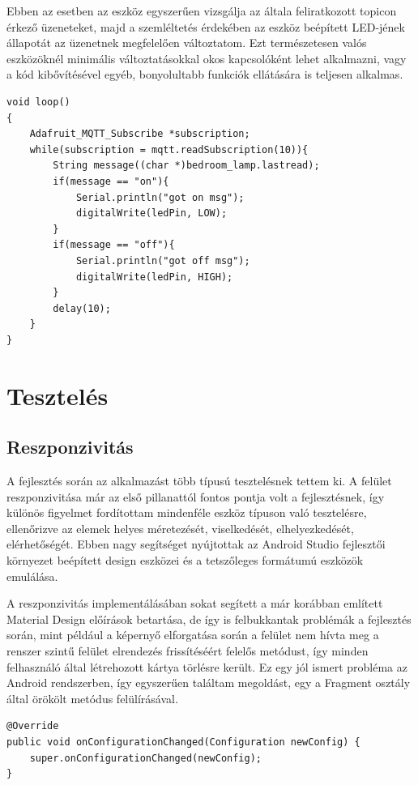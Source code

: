 \documentclass[
]{thesis-ekf}
\theoremstyle{definition}
\theoremstyle{remark}
\begin{document}
Ebben az esetben az eszköz egyszerűen vizsgálja az általa feliratkozott topicon érkező
üzeneteket, majd a szemléltetés érdekében az eszköz beépített LED-jének állapotát az üzenetnek megfelelően változtatom.
Ezt természetesen valós eszközöknél minimális változtatásokkal okos kapcsolóként lehet alkalmazni, vagy a kód kibővítésével
egyéb, bonyolultabb funkciók ellátására is teljesen alkalmas.

\lstset{language=C++}
\begin{lstlisting}[frame=single]
void loop() 
{
	Adafruit_MQTT_Subscribe *subscription; 
	while(subscription = mqtt.readSubscription(10)){
		String message((char *)bedroom_lamp.lastread);
		if(message == "on"){
			Serial.println("got on msg");
			digitalWrite(ledPin, LOW);
		}
		if(message == "off"){
			Serial.println("got off msg");
			digitalWrite(ledPin, HIGH);
		}     
		delay(10);
	}
}
\end{lstlisting}

\section{Tesztelés}

\subsection{Reszponzivitás}
A fejlesztés során az alkalmazást több típusú tesztelésnek tettem ki. A felület reszponzivitása már az első pillanattól
fontos pontja volt a fejlesztésnek, így különös figyelmet fordítottam mindenféle eszköz típuson való tesztelésre, ellenőrizve
az elemek helyes méretezését, viselkedését, elhelyezkedését, elérhetőségét. Ebben nagy segítséget nyújtottak az 
Android Studio fejlesztői környezet beépített design eszközei és a tetszőleges formátumú eszközök emulálása. 

A reszponzivitás implementálásában sokat segített a már korábban említett Material Design\cite{material} előírások betartása,
de így is felbukkantak problémák a fejlesztés során, mint például a képernyő elforgatása során a felület 
nem hívta meg a renszer szintű felület elrendezés frissítéséért felelős metódust, 
így minden felhasználó által létrehozott kártya törlésre került. Ez egy jól ismert probléma az Android rendszerben, 
így egyszerűen találtam megoldást, egy a Fragment osztály által örökölt metódus felülírásával.

\lstset{language=Java}  
\begin{lstlisting}[frame=single]
@Override
public void onConfigurationChanged(Configuration newConfig) {
	super.onConfigurationChanged(newConfig);
}
\end{lstlisting}
\end{document}
